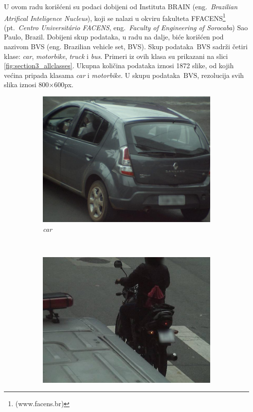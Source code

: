 \documentclass[12pt,oneside]{memoir}
\newcommand{\bvs}{\ensuremath{\,\textrm{BVS}}}
\begin{document}
U ovom radu korišćeni su podaci dobijeni od Instituta BRAIN (eng.~\textit{Brazilian Atrifical Inteligence Nucleus}), koji se nalazi u okviru fakulteta FFACENS\footnote{(www.facens.br)} (pt.~\textit{Centro Universitário FACENS}, eng.~\textit{Faculty of Engineering of Sorocaba}) Sao Paulo, Brazil. Dobijeni skup podataka, u radu na dalje, biće korišćen pod nazivom BVS (eng. Brazilian vehicle set, BVS).
Skup podataka \bvs{} sadrži četiri klase: \textit{car}, \textit{motorbike}, \textit{truck} i \textit{bus}. Primeri iz ovih klasa su prikazani na slici \ref{fig:section3_allclasses}. Ukupna količina podataka iznosi 1872 slike, od kojih većina pripada klasama \textit{car} i \textit{motorbike}. U skupu podataka \bvs, rezolucija svih slika iznosi 800$\times$600px. 

\begin{figure}
    \centering
    \begin{subfigure}[b]{0.48\textwidth}
        \includegraphics[width=\textwidth]{matfmaster/glava3/car.jpg}
        \caption{\textit{car}}
        \label{fig:section3_car}
    \end{subfigure}
    ~
    \begin{subfigure}[b]{0.48\textwidth}
        \includegraphics[width=\textwidth]{matfmaster/glava3/bike.jpg}

\end{subfigure}
\end{figure}
\end{document}
